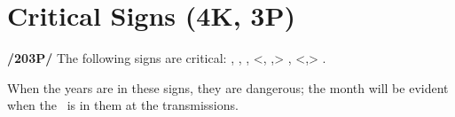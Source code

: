 \section{Critical Signs (4K, 3P)}
\textbf{/203P/} The following signs are critical: \Aries, \Taurus, \Cancer, <\Leo, \Libra,> \Scorpio, <\Capricorn,> \Aquarius. 

When the years are in these signs, they are dangerous; the month will be evident when the \Sun\, is in them at the transmissions.

\newpage